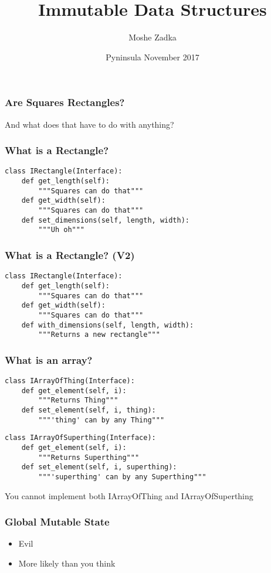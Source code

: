 \documentclass{beamer}
\title{Immutable Data Structures}
\author{Moshe Zadka}
\date{Pyninsula November 2017}
\begin{document}
 
\frame{\titlepage}

\begin{frame}
\frametitle{Are Squares Rectangles?}
And what does that have to do with anything?
\end{frame}

\begin{frame}[fragile]
\frametitle{What is a Rectangle?}
\begin{lstlisting}
class IRectangle(Interface):
    def get_length(self):
        """Squares can do that"""
    def get_width(self):
        """Squares can do that"""
    def set_dimensions(self, length, width):
        """Uh oh"""
\end{lstlisting}
\end{frame}

\begin{frame}[fragile]
\frametitle{What is a Rectangle? (V2)}
\begin{lstlisting}
class IRectangle(Interface):
    def get_length(self):
        """Squares can do that"""
    def get_width(self):
        """Squares can do that"""
    def with_dimensions(self, length, width):
        """Returns a new rectangle"""
\end{lstlisting}
\end{frame}

\begin{frame}[fragile]
\frametitle{What is an array?}
\begin{lstlisting}
class IArrayOfThing(Interface):
    def get_element(self, i):
        """Returns Thing"""
    def set_element(self, i, thing):
        """'thing' can by any Thing"""
\end{lstlisting}\pause
\begin{lstlisting}
class IArrayOfSuperthing(Interface):
    def get_element(self, i):
        """Returns Superthing"""
    def set_element(self, i, superthing):
        """'superthing' can by any Superthing"""
\end{lstlisting} \pause

You cannot implement both IArrayOfThing and IArrayOfSuperthing
\end{frame}

\begin{frame}[fragile]
\frametitle{Global Mutable State}
\begin{itemize}
\item Evil
\item More likely than you think
\end{itemize}
\end{frame}
\end{document}
